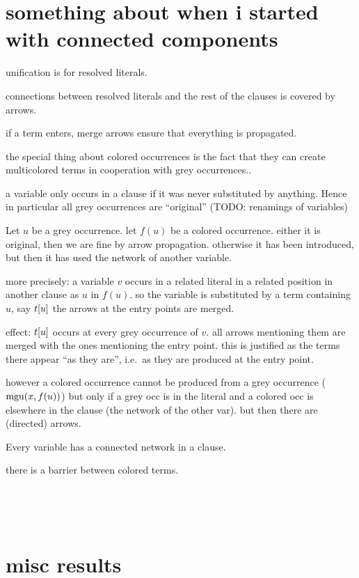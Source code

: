 \documentclass[,%
	paper=a4,%
	DIV9, %
	twoside=false,%
	liststotoc,
	bibtotoc,
	draft=false,%
	numbers=noendperiod
]{scrartcl}
\begin{document}
\section*{something about when i started with connected components}

unification is for resolved literals.

connections between resolved literals and the rest of the clauses is covered by arrows.

if a term enters, merge arrows ensure that everything is propagated.

the special thing about colored occurrences is the fact that they can create multicolored terms in cooperation with grey occurrences..

a variable only occurs in a clause if it was never substituted by anything. Hence in particular all grey occurrences are ``original'' (TODO: renamings of variables)

Let $u$ be a grey occurrence.
let $f(u)$ be a colored occurrence.
either it is original, then we are fine by arrow propagation.
otherwise it has been introduced, but then it has used the network of another variable.

more precisely: %
a variable $v$ occurs in a related literal in a related position in another clause as $u$ in $f(u)$.
so the variable is substituted by a term containing $u$, say $t[u]$
the arrows at the entry points are merged.

effect: 
$t[u]$ occurs at every grey occurrence of $v$. all arrows mentioning them are merged with the ones mentioning the entry point.
this is justified as the terms there appear ``as they are'', i.e.\ as they are produced at the entry point.

however a colored occurrence cannot be produced from a grey occurrence ($\operatorname{mgu}(x, f(u))$) but only if a grey occ is in the literal and a colored occ is elsewhere in the clause (the network of the other var). but then there are (directed) arrows.


Every variable has a connected network in a clause. 

there is a barrier between colored terms.

~

~

\section{misc results}
\end{document}
